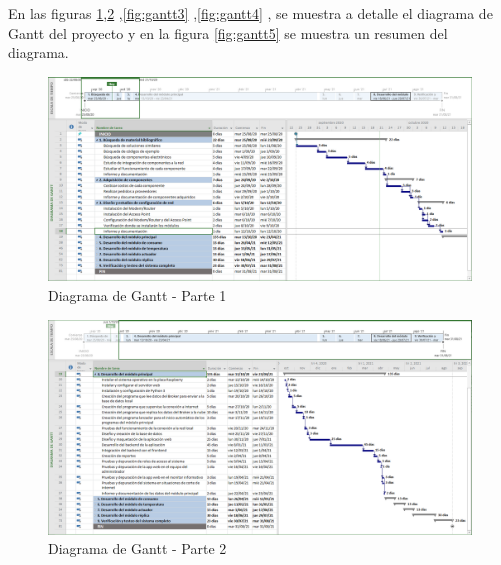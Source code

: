 \documentclass[11pt]{charter}
\begin{document}
En las figuras \ref{fig:gantt1},\ref{fig:gantt2} ,\ref{fig:gantt3} ,\ref{fig:gantt4} , se muestra a detalle el diagrama de Gantt del proyecto y en la figura \ref{fig:gantt5} se muestra un resumen del diagrama.
\begin{landscape} %
\begin{figure}[htpb]
\centering 
\includegraphics[width=1.5\textwidth]{./Figuras/gantt01.png}
\caption{Diagrama de Gantt - Parte 1}
\label{fig:gantt1}
\end{figure}
\end{landscape} %
\begin{landscape} %
\begin{figure}[htpb]
\centering 
\includegraphics[width=1.5\textwidth]{./Figuras/gantt02.png}
\caption{Diagrama de Gantt - Parte 2}
\label{fig:gantt2}
\end{figure}
\end{landscape} %
\end{document}
